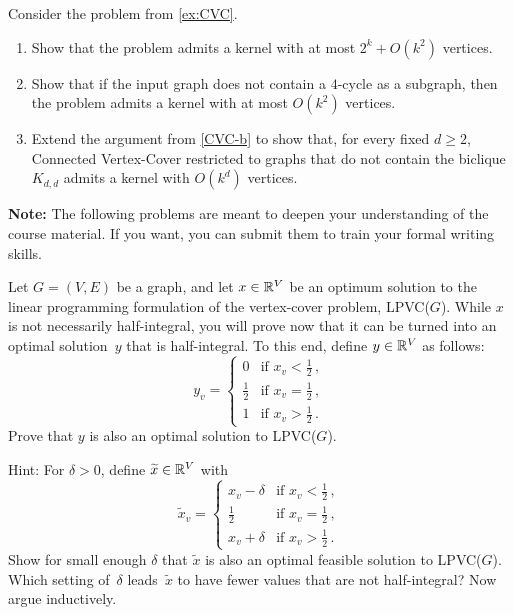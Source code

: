 \documentclass{uebung_cs}
\begin{document}
\begin{exercise}
  Consider the problem from \ref{ex:CVC}.
  \begin{enumerate}
      \item Show that the problem admits a kernel with at most $2^k + O(k^2)$ vertices.
      \item\label{CVC-b} Show that if the input graph does not contain a $4$-cycle as a subgraph, then the problem admits a
      kernel with at most $O(k^2)$ vertices.
      \item Extend the argument from \ref{CVC-b} to show that, for every fixed $d \geq 2$, Connected Vertex-Cover restricted to graphs that do not contain the biclique $K_{d,d}$ admits a kernel with $O(k^d)$ vertices.
  \end{enumerate}
\end{exercise}

\newpage
\textbf{Note:} The following problems are meant to deepen your understanding of the course material. If you want, you can submit them to train your formal writing skills.

\begin{exercise}
  Let $G = (V, E)$ be a graph, and let $x \in \mathbb{R}^V$ be an
  optimum solution to the linear programming formulation of the vertex-cover problem, LPVC($G$). While $x$ is not necessarily half-integral, you will prove now that it can be turned into an optimal solution~$y$ that is half-integral. To this end, define
  $y\in\mathbb{R}^V$ as follows:
  \[
  y_v = \begin{cases}
  0 & \text{if } x_v < \frac{1}{2}\,, \\
  \frac{1}{2} & \text{if } x_v = \frac{1}{2}\,, \\
  1 & \text{if } x_v > \frac{1}{2}\,.
  \end{cases}
  \]
  Prove that $y$ is also an optimal solution to LPVC($G$).

  Hint: For $\delta>0$, define $\widetilde x\in\mathbb{R}^V$ with\[
    \widetilde x_v = \begin{cases}
    x_v-\delta & \text{if } x_v < \frac{1}{2}\,, \\
    \frac{1}{2} & \text{if } x_v = \frac{1}{2}\,, \\
    x_v+\delta & \text{if } x_v > \frac{1}{2}\,.
    \end{cases}
    \]
    Show for small enough $\delta$ that $\widetilde x$ is also an optimal feasible solution to LPVC($G$). Which setting of~$\delta$ leads~$\widetilde x$ to have fewer values that are not half-integral? Now argue inductively.
\end{exercise}
\end{document}
